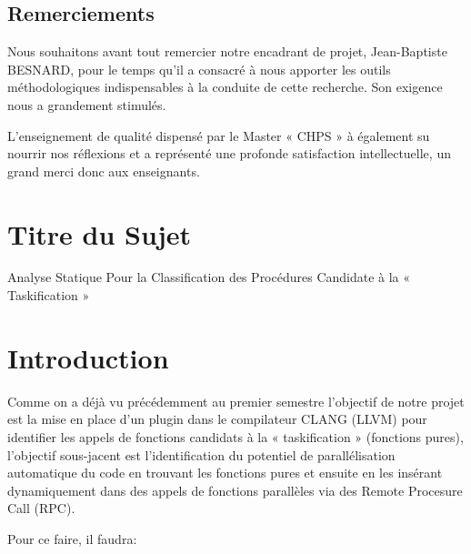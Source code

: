 \documentclass[12pt,a4paper]{article}
\begin{document}
\begin{center}
	\begin{minipage}{13cm}


\section*{ \huge \bfseries \center Remerciements}
Nous souhaitons avant tout remercier notre encadrant de projet, Jean-Baptiste BESNARD, pour le temps qu’il a consacré à nous apporter les outils méthodologiques indispensables à la conduite de cette recherche. Son exigence nous a grandement stimulés.

L’enseignement de qualité dispensé par le Master « CHPS » à également su nourrir nos réflexions et a représenté une profonde satisfaction intellectuelle, un grand merci donc aux enseignants.

	\end{minipage}
\end{center}





\pagebreak
\listoffigures

\tableofcontents

\pagebreak

\section{Titre du Sujet}

Analyse Statique Pour la Classification des Procédures Candidate à la « Taskification »

\section{Introduction}

Comme on a déjà vu précédemment au premier semestre l'objectif de notre projet est la mise en place d’un plugin dans le compilateur CLANG (LLVM) pour identifier les appels de fonctions candidats à la « taskification » (fonctions pures), l'objectif sous-jacent est l'identification du potentiel de parallélisation automatique du code en trouvant les fonctions pures et ensuite en les insérant dynamiquement dans des appels de fonctions parallèles via des Remote Procesure Call (RPC).

Pour ce faire, il faudra: 
\end{document}
